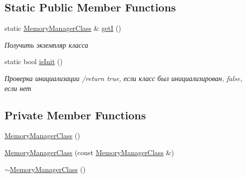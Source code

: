 \subsection*{Static Public Member Functions}
\begin{DoxyCompactItemize}
\item 
static \hyperlink{class_memory_manager_class}{Memory\+Manager\+Class} \& \hyperlink{class_memory_manager_class_ab4c7d7b5820dde4d7d361bd9b1f7b41c}{getI} ()
\begin{DoxyCompactList}\small\item\em Получить экземпляр класса \end{DoxyCompactList}\item 
static bool \hyperlink{class_memory_manager_class_a8e3d0ccd0e511f1865ae8fc2805a36a4}{is\+Init} ()
\begin{DoxyCompactList}\small\item\em Проверка инициализации /return true, если класс был инициализирован, false, если нет \end{DoxyCompactList}\end{DoxyCompactItemize}
\subsection*{Private Member Functions}
\begin{DoxyCompactItemize}
\item 
\hyperlink{class_memory_manager_class_a6240ddcc63f726fd26af2c15be9d24ac}{Memory\+Manager\+Class} ()
\item 
\hyperlink{class_memory_manager_class_a8e23a7eaace2bb242af6e6ff9fe41078}{Memory\+Manager\+Class} (const \hyperlink{class_memory_manager_class}{Memory\+Manager\+Class} \&)
\item 
\hyperlink{class_memory_manager_class_a6be22909a8c206c18fa8576b25f656c9}{$\sim$\+Memory\+Manager\+Class} ()
\end{DoxyCompactItemize}
